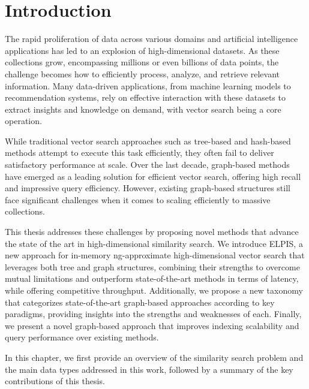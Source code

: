 \graphicspath{{../img/intro/}}

\chapter{Introduction}
The rapid proliferation of data across various domains and artificial intelligence applications has led to an explosion of high-dimensional datasets. As these collections grow, encompassing millions or even billions of data points, the challenge becomes how to efficiently process, analyze, and retrieve relevant information. Many data-driven applications, from machine learning models to recommendation systems, rely on effective interaction with these datasets to extract insights and knowledge on demand, with vector search being a core operation.

While traditional vector search approaches such as tree-based and hash-based methods attempt to execute this task efficiently, they often fail to deliver satisfactory performance at scale. Over the last decade, graph-based methods have emerged as a leading solution for efficient vector search, offering high recall and impressive query efficiency. However, existing graph-based structures still face significant challenges when it comes to scaling efficiently to massive collections.

This thesis addresses these challenges by proposing novel methods that advance the state of the art in high-dimensional similarity search. We introduce ELPIS, a new approach for in-memory ng-approximate high-dimensional vector search that leverages both tree and graph structures, combining their strengths to overcome mutual limitations and outperform state-of-the-art methods in terms of latency, while offering competitive throughput. Additionally, we propose a new taxonomy that categorizes state-of-the-art graph-based approaches according to key paradigms, providing insights into the strengths and weaknesses of each. Finally, we present a novel graph-based approach that improves indexing scalability and query performance over existing methods.

In this chapter, we first provide an overview of the similarity search problem and the main data types addressed in this work, followed by a summary of the key contributions of this thesis.
\clearpage 

